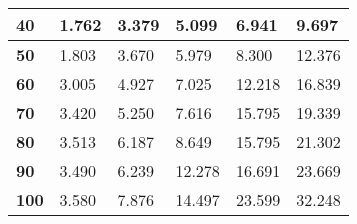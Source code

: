 \begin{table}[H]
\begin{tabular}{|l|l|l|l|l|l|}
\textbf{40}                               & 1.762           & 3.379            & 5.099            & 6.941            & 9.697            \\ \hline
\textbf{50}                               & 1.803           & 3.670            & 5.979            & 8.300            & 12.376           \\ \hline
\textbf{60}                               & 3.005           & 4.927            & 7.025            & 12.218           & 16.839           \\ \hline
\textbf{70}                               & 3.420           & 5.250            & 7.616            & 15.795           & 19.339           \\ \hline
\textbf{80}                               & 3.513           & 6.187            & 8.649            & 15.795           & 21.302           \\ \hline
\textbf{90}                               & 3.490           & 6.239            & 12.278           & 16.691           & 23.669           \\ \hline
\textbf{100}                              & 3.580           & 7.876            & 14.497           & 23.599           & 32.248           \\ \hline
\end{tabular}
\end{table}

